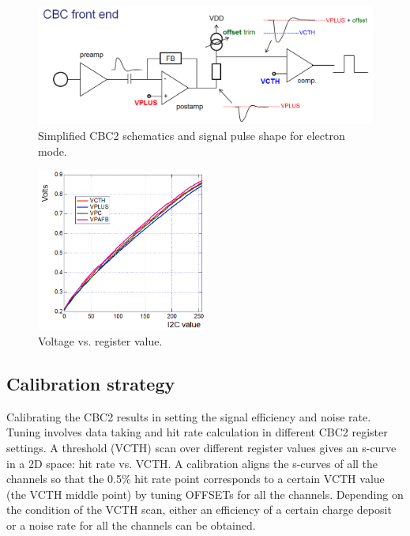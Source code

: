 \documentclass[11pt,a4paper]{article}
\begin{document}
	\begin{figure}[htbp]
	\centering
	\includegraphics[width=\textwidth]{fig/CBC.png}
	\caption{Simplified CBC2 schematics and signal pulse shape for electron mode. }\label{fig:CBC2}
	\end{figure}

	\begin{figure}[htbp]
	\centering
	\includegraphics[width=0.5\textwidth]{fig/VoltI2c.png}
	\caption{Voltage vs. register value. }\label{fig:volt-i2c}
	\end{figure}

	\subsection{Calibration strategy}
	Calibrating the CBC2 results in setting the signal efficiency and noise rate.
	Tuning involves data taking and hit rate calculation in different CBC2 register settings. 
	A threshold (VCTH) scan over different register values gives an s-curve in a 2D space: hit rate vs. VCTH.
	A calibration aligns the s-curves of all the channels so that the 0.5\% hit rate point corresponds to
	a certain VCTH value (the VCTH middle point) by tuning OFFSETs for all the channels. 
	Depending on the condition of the VCTH scan, either an efficiency of a certain charge deposit or a noise rate
	for all the channels can be obtained. 
\end{document}
